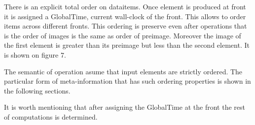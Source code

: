 
\label {fs-timing-model}

There is an explicit total order on dataitems. Once element is produced at front it is assigned a GlobalTime, current wall-clock of the front. This allows to order items across different fronts. This ordering is preserve even after operations that is the order of images is the same as order of preimage. Moreover the image of the first element is greater than its preimage but less than the second element. It is shown on figure 7.


The semantic of operation asume that input elements are strictly ordered. The particular form of meta-information that has such ordering properties is shown in the following sections.

It is worth mentioning that after assigning the GlobalTime at the front the rest of computations is determined.
